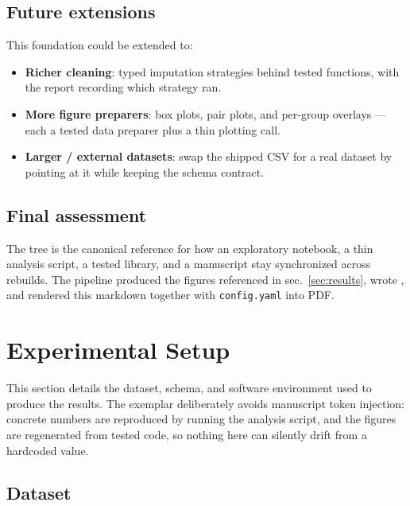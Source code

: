 \documentclass[
  english,
]{article}
\providecommand{\tightlist}{%
  \setlength{\itemsep}{0pt}\setlength{\parskip}{0pt}}
\begin{document}
\subsection{Future extensions}\label{future-extensions}

This foundation could be extended to:

\begin{itemize}
\tightlist
\item
  \textbf{Richer cleaning}: typed imputation strategies behind tested
  functions, with the report recording which strategy ran.
\item
  \textbf{More figure preparers}: box plots, pair plots, and per-group
  overlays --- each a tested data preparer plus a thin plotting call.
\item
  \textbf{Larger / external datasets}: swap the shipped CSV for a real
  dataset by pointing  at it while
  keeping the schema contract.
\end{itemize}

\subsection{Final assessment}\label{final-assessment}

The  tree is the canonical reference for
how an exploratory notebook, a thin analysis script, a tested library,
and a manuscript stay synchronized across rebuilds. The pipeline
produced the figures referenced in sec.~\ref{sec:results}, wrote
, and rendered this markdown
together with \texttt{config.yaml} into PDF.

\newpage

\section{Experimental Setup}\label{sec:experimental_setup}

This section details the dataset, schema, and software environment used
to produce the results. The exemplar deliberately avoids manuscript
token injection: concrete numbers are reproduced by running the analysis
script, and the figures are regenerated from tested code, so nothing
here can silently drift from a hardcoded value.

\subsection{Dataset}\label{dataset}
\end{document}
